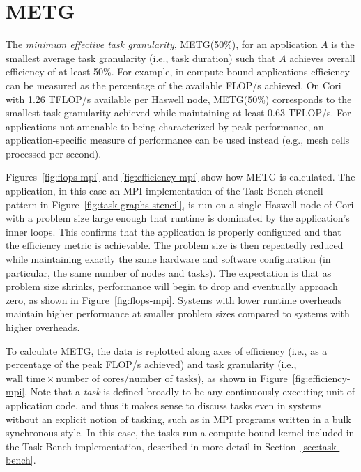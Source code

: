 \section{METG}
\label{sec:metg}




The \emph{minimum effective task granularity}, METG(50\%), for an application $A$ is
the smallest average task granularity (i.e., task duration) such that $A$
achieves overall efficiency of at least 50\%. For example, in
compute-bound applications efficiency can be measured as the
percentage of the available FLOP/s achieved. On Cori with 1.26 TFLOP/s available per Haswell node, METG(50\%) corresponds to
the smallest task granularity achieved while maintaining at least 0.63
TFLOP/s. For applications not amenable to being characterized by peak
performance, an application-specific measure of performance can be
used instead (e.g., mesh cells processed per second).

Figures~\ref{fig:flops-mpi} and \ref{fig:efficiency-mpi} show how METG is
calculated. The application, in this case an MPI implementation of the
Task Bench stencil pattern in Figure~\ref{fig:task-graphs-stencil}, is
run on a single Haswell node of Cori with a problem size large enough
that runtime is dominated by the application's inner loops. This confirms
that the application is properly configured and that the
efficiency metric is achievable. The problem
size is then repeatedly reduced while maintaining exactly the same hardware and software
configuration (in particular, the same number of nodes and tasks). The
expectation is that as problem size shrinks,
performance will begin to drop and eventually approach zero, as shown in Figure~\ref{fig:flops-mpi}. Systems
with lower runtime overheads maintain higher performance at smaller
problem sizes compared to systems with higher overheads.

To calculate METG, the data is replotted along axes of efficiency
(i.e., as a percentage of the peak FLOP/s achieved) and task
granularity (i.e., $\text{wall time} \times \text{number of
  cores}/\text{number of tasks}$), as shown in Figure~\ref{fig:efficiency-mpi}. Note that a \emph{task} is defined
broadly to be any continuously-executing unit of application code,
and thus it makes sense to discuss tasks even in systems
without an explicit notion of tasking, such as in MPI programs written in a bulk synchronous style. In this case, the tasks run a
compute-bound kernel included in the Task Bench implementation,
described in more detail in Section~\ref{sec:task-bench}.

